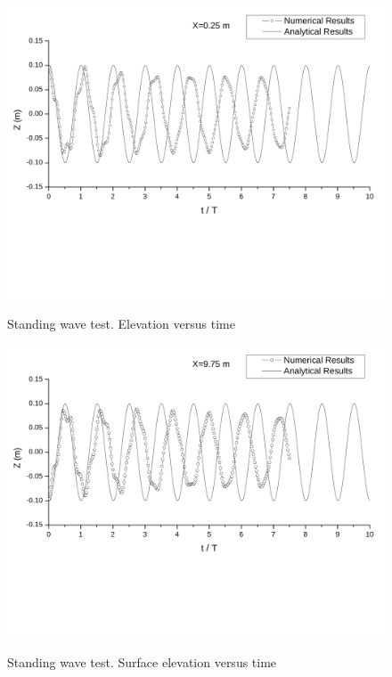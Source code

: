 \begin{figure}[h]

\vspace{0.1in}
\hspace{0.3in}
\includegraphics[scale=0.45]{../figures/SRM/elevation_x025_SRM_cropped_bottom24.pdf}
\label{fig:elevation_x025_SRM_cropped_bottom24}
\caption{Standing wave test. Elevation versus time}


\vspace{0.9in}
\hspace{0.3in}
\includegraphics[scale=0.45]{../figures/SRM/elevation_x975_SRM_cropped_bottom24.pdf}
\label{fig:elevation_x975_SRM_cropped_bottom24}
\caption{Standing wave test. Surface elevation versus time}
\end{figure}

